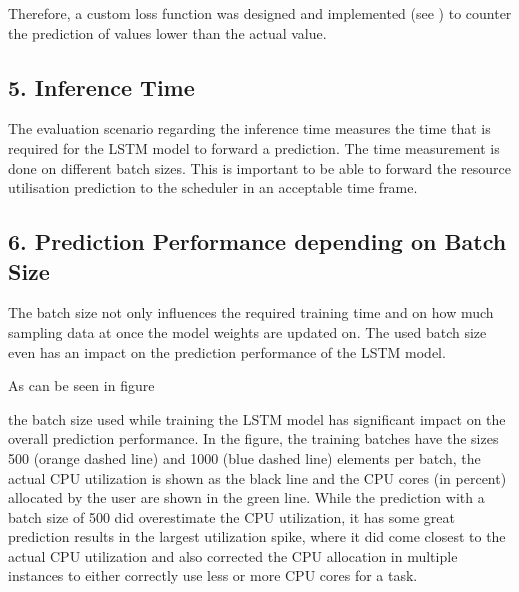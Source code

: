       Therefore, a custom loss function was designed and implemented (see ) to counter the prediction of values lower than the actual value.

  \subsection{5. Inference Time}
  \label{sec:inference-time-evaluation-scenarios}

    The evaluation scenario regarding the inference time measures the time that is required for the LSTM model to forward a prediction.
    The time measurement is done on different batch sizes. This is important to be able to forward the resource utilisation prediction to the scheduler in an acceptable time frame.


  \subsection{6. Prediction Performance depending on Batch Size}
  \label{sec:prediction-performance-depending-on-batch-size-evaluation-scenarios}






  The batch size not only influences the required training time and  on how much sampling data at once the model weights are updated on. The used batch size even has an impact on the prediction performance of the LSTM model.
    
  As can be seen in figure 
  
  the batch size used while training the LSTM model has significant impact on the overall prediction performance.
  In the figure, the training batches have the sizes 500 (orange dashed line) and 1000 (blue dashed line) elements per batch, the actual CPU utilization is shown as the black line and the CPU cores (in percent) allocated by the user are shown in the green line. While the prediction with a batch size of 500 did overestimate the CPU utilization, it has some great prediction results in the largest utilization spike, where it did come closest to the actual CPU utilization and also corrected the CPU allocation in multiple instances to either correctly use less or more CPU cores for a task.
  
  
